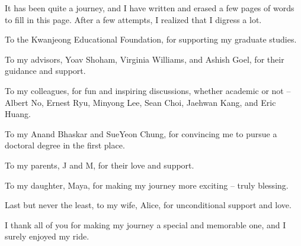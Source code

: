 It has been quite a journey, and I have written and erased a few pages of words to fill in this page. After a few attempts, I realized that I digress a lot. 




To the Kwanjeong Educational Foundation, for supporting my graduate studies.

To my advisors, Yoav Shoham, Virginia Williams, and Ashish Goel, for their guidance and support. 

To my colleagues, for fun and inspiring discussions, whether academic or not -- Albert No, Ernest Ryu, Minyong Lee, Sean Choi, Jaehwan Kang, and Eric Huang. 

To my Anand Bhaskar and SueYeon Chung, for convincing me to pursue a doctoral degree in the first place. 

To my parents, J and M, for their love and support. 

To my daughter, Maya, for making my journey more exciting -- truly blessing. 

Last but never the least, to my wife, Alice, for unconditional support and love.

I thank all of you for making my journey a special and memorable one, and I surely enjoyed my ride. 



%
%



